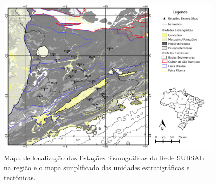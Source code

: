 \begin{figure}[!ht]
\centering
\includegraphics[scale=0.6]{Figs/mapa_estacoes_geologico.png}
\caption[Mapa de localização das Estações Sismográficas na região com o mapa geológico simplificado.]{Mapa de localização das Estações Sismográficas da Rede SUBSAL na região e o mapa simplificado das unidades estratigráficas e tectônicas.}
\label{mapa_estacoes_geologico}
\end{figure}


